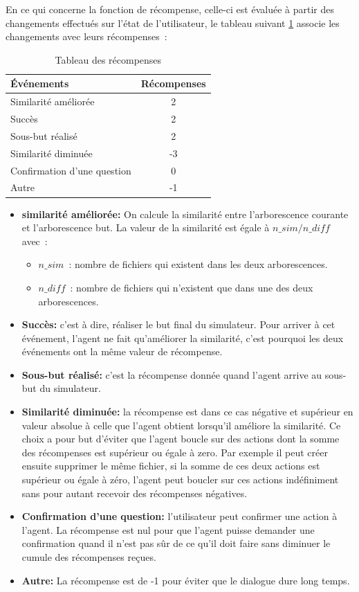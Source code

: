 En ce qui concerne la fonction de récompense, celle-ci est évaluée à partir des changements effectués sur l’état de l’utilisateur, le tableau suivant \ref{table_reward} associe les changements avec leurs récompenses :
\begin{table}[H]\label{table_reward}
	\begin{center}
		
		\begin{tabular}{l|c} %
			\textbf{Événements} & \textbf{Récompenses}\\
			\hline
			Similarité améliorée & 2\\
			\hline
			Succès & 2\\
			\hline
			Sous-but réalisé & 2\\
			\hline
			Similarité diminuée & -3\\
			\hline
			Confirmation d'une question & 0\\
			\hline
			Autre & -1\\
			\hline
		\end{tabular}
	\caption{Tableau des récompenses}
	\end{center}
\end{table}
\begin{itemize}
	\item \textbf{similarité améliorée:} On calcule la similarité entre l'arborescence courante et l'arborescence but. La valeur de la similarité est égale à $n\_sim/n\_diff$ avec : 
	\begin{itemize}
		\item $n\_sim$ : nombre de fichiers qui existent dans les deux arborescences.
		\item $n\_diff$ : nombre de fichiers qui n’existent que dans une des deux arborescences.  
	\end{itemize}
	\item \textbf{Succès:} c'est à dire, réaliser le but final du simulateur. Pour arriver à cet événement, l'agent ne fait qu'améliorer la similarité, c'est pourquoi les deux événements ont la même valeur de récompense.
	\item \textbf{Sous-but réalisé:} c'est la récompense donnée quand l'agent arrive au sous-but du simulateur.
	\item \textbf{Similarité diminuée:} la récompense est dans ce cas négative et supérieur en valeur absolue à celle que l'agent obtient lorsqu'il améliore la similarité. Ce choix a pour but d'éviter que l'agent boucle sur des actions dont la somme des récompenses est supérieur ou égale à zero. Par exemple il peut créer ensuite supprimer le même fichier, si la somme de ces deux actions est supérieur ou égale à zéro, l'agent peut boucler sur ces actions indéfiniment sans pour autant recevoir des récompenses négatives.
	\item \textbf{Confirmation d'une question:} l'utilisateur peut confirmer une action à l'agent. La récompense est nul pour que l'agent puisse demander une confirmation quand il n'est pas sûr de ce qu'il doit faire sans diminuer le cumule des récompenses reçues.
	\item \textbf{Autre:} La récompense est de -1 pour éviter que le dialogue dure long temps. 
\end{itemize}
